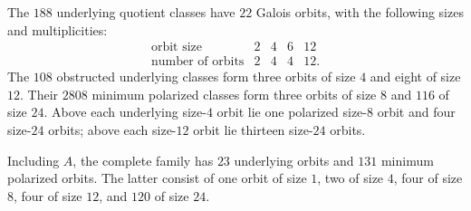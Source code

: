 \begin{theorem}
\label{pp:thm:completequotientorbits}
The $188$ underlying quotient classes have $22$ Galois orbits, with
the following sizes and multiplicities:
\[
\begin{array}{c|rrrr}
\text{orbit size}&2&4&6&12\\\hline
\text{number of orbits}&2&4&4&12.
\end{array}
\]
The $108$ obstructed underlying classes form three orbits of size $4$
and eight of size $12$. Their $2808$ minimum polarized classes form
three orbits of size $8$ and $116$ of size $24$.
Above each underlying size-$4$ orbit lie one polarized size-$8$ orbit
and four size-$24$ orbits; above each size-$12$ orbit lie thirteen
size-$24$ orbits.

Including $A$, the complete family has $23$ underlying orbits and
$131$ minimum polarized orbits. The latter consist of one orbit of
size $1$, two of size $4$, four of size $8$, four of size $12$, and
$120$ of size $24$.
\end{theorem}
